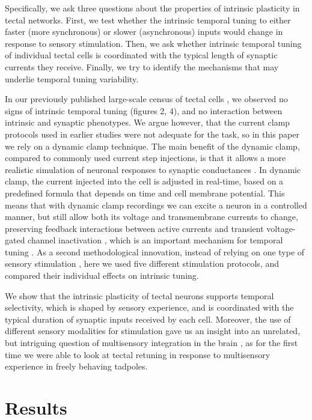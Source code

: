 \documentclass{article}
\begin{document}
Specifically, we ask three questions about the properties of intrinsic plasticity in tectal networks. First, we test whether the intrinsic temporal tuning to either faster (more synchronous) or slower (asynchronous) inputs would change in response to sensory stimulation. Then, we ask whether intrinsic temporal tuning of individual tectal cells is coordinated with the typical length of synaptic currents they receive. Finally, we try to identify the mechanisms that may underlie temporal tuning variability. 

In our previously published large-scale census of tectal cells \citep{ciarleglio2015}, we observed no signs of intrinsic temporal tuning (figures 2, 4), and no interaction between intrinsic and synaptic phenotypes. We argue however, that the current clamp protocols used in earlier studies were not adequate for the task, so in this paper we rely on a dynamic clamp technique. The main benefit of the dynamic clamp, compared to commonly used current step injections, is that it allows a more realistic simulation of neuronal responses to synaptic conductances \citep{prinz2004}. In dynamic clamp, the current injected into the cell is adjusted in real-time, based on a predefined formula that depends on time and cell membrane potential. This means that with dynamic clamp recordings we can excite a neuron in a controlled manner, but still allow both its voltage and transmembrane currents to change, preserving feedback interactions between active currents and transient voltage-gated channel inactivation \citep{ma1996dynamic,zbili2019axonnav}, which is an important mechanism for temporal tuning \citep{branco2010dendritic,platkiewicz2011}. As a second methodological innovation, instead of relying on one type of sensory stimulation \citep{ciarleglio2015}, here we used five different stimulation protocols, and compared their individual effects on intrinsic tuning. 

We show that the intrinsic plasticity of tectal neurons supports temporal selectivity, which is shaped by sensory experience, and is coordinated with the typical duration of synaptic inputs received by each cell. Moreover, the use of different sensory modalities for stimulation gave us an insight into an unrelated, but intriguing question of multisensory integration in the brain \citep{deeg2009,felch2016,truszkowski2017}, as for the first time we were able to look at tectal retuning in response to multisensory experience in freely behaving tadpoles.


\section*{Results}
\end{document}
